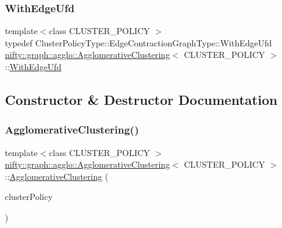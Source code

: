 \mbox{\label{classnifty_1_1graph_1_1agglo_1_1AgglomerativeClustering_ad271a88b3736ec7b3d6a4e47e718828a}} 
\subsubsection{\texorpdfstring{With\+Edge\+Ufd}{WithEdgeUfd}}
{\footnotesize\ttfamily template$<$class C\+L\+U\+S\+T\+E\+R\+\_\+\+P\+O\+L\+I\+CY $>$ \\
typedef Cluster\+Policy\+Type\+::\+Edge\+Contraction\+Graph\+Type\+::\+With\+Edge\+Ufd \hyperlink{classnifty_1_1graph_1_1agglo_1_1AgglomerativeClustering}{nifty\+::graph\+::agglo\+::\+Agglomerative\+Clustering}$<$ C\+L\+U\+S\+T\+E\+R\+\_\+\+P\+O\+L\+I\+CY $>$\+::\hyperlink{classnifty_1_1graph_1_1agglo_1_1AgglomerativeClustering_ad271a88b3736ec7b3d6a4e47e718828a}{With\+Edge\+Ufd}}



\subsection{Constructor \& Destructor Documentation}
\mbox{\label{classnifty_1_1graph_1_1agglo_1_1AgglomerativeClustering_a4c1ae55dc3568df3f2e0ffe9e34963df}} 
\subsubsection{\texorpdfstring{Agglomerative\+Clustering()}{AgglomerativeClustering()}}
{\footnotesize\ttfamily template$<$class C\+L\+U\+S\+T\+E\+R\+\_\+\+P\+O\+L\+I\+CY $>$ \\
\hyperlink{classnifty_1_1graph_1_1agglo_1_1AgglomerativeClustering}{nifty\+::graph\+::agglo\+::\+Agglomerative\+Clustering}$<$ C\+L\+U\+S\+T\+E\+R\+\_\+\+P\+O\+L\+I\+CY $>$\+::\hyperlink{classnifty_1_1graph_1_1agglo_1_1AgglomerativeClustering}{Agglomerative\+Clustering} (\begin{DoxyParamCaption}\item[{\hyperlink{classnifty_1_1graph_1_1agglo_1_1AgglomerativeClustering_a3a678ecd37725f2c0f8ec56857768034}{Cluster\+Policy\+Type} \&}]{cluster\+Policy }\end{DoxyParamCaption})\hspace{0.3cm}{\ttfamily [inline]}}



